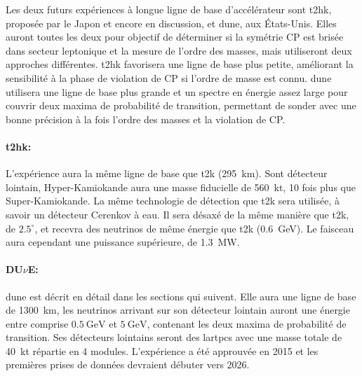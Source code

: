         Les deux futurs expériences à longue ligne de base d'accélérateur sont \gls{t2hk}, proposée par le Japon et encore en discussion, et \gls{dune}, aux États-Unis. %
        Elles auront toutes les deux pour objectif de déterminer si la symétrie CP est brisée dans secteur leptonique et la mesure de l'ordre des masses, mais utiliseront deux approches différentes. \gls{t2hk} favorisera une ligne de base plus petite, améliorant la sensibilité à la phase de violation de CP si l'ordre de masse est connu. \gls{dune} utilisera une ligne de base plus grande et un spectre en énergie assez large pour couvrir deux maxima de probabilité de transition, permettant de sonder avec une bonne précision à la fois l'ordre des masses et la violation de CP.%
        
        \paragraph{\gls{t2hk}\cite{HK2018}:} L'expérience aura la même ligne de base que \gls{t2k} (\SI{295}{\kilo\meter}). Sont détecteur lointain, Hyper-Kamiokande aura une masse fiducielle de \SI{560}{\kilo\tonne}, 10 fois plus que Super-Kamiokande. La même technologie de détection que \gls{t2k} sera utilisée, à savoir un détecteur Cerenkov à eau. Il sera désaxé de la même manière que \gls{t2k}, de $2.5^{\circ}$, et recevra des neutrinos de même énergie que \gls{t2k} (\SI{0.6}{\giga\electronvolt}). Le faisceau aura cependant une puissance supérieure, de \SI{1.3}{\mega\watt}. 
        
        \paragraph{\texorpdfstring{DU$\nu$E}{DUNE}\cite{Acciarri2016}:} \gls{dune} est décrit en détail dans les sections qui suivent. Elle aura une ligne de base de \SI{1300}{\kilo\meter}, les neutrinos arrivant sur son détecteur lointain auront une énergie entre comprise $\SI{0.5}{\giga\electronvolt}$ et $\SI{5}{\giga\electronvolt}$, contenant les deux maxima de probabilité de transition. Ses détecteurs lointains seront des \glspl{lartpc} avec une masse totale de \SI{40}{\kilo\tonne} répartie en 4 modules. L'expérience a été approuvée en 2015 et les premières prises de données devraient débuter vers 2026.
        
